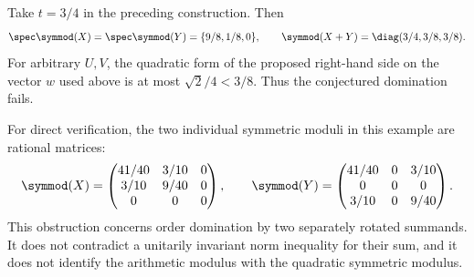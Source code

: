 \begin{corollary}\label{cor:mi06-rational}
Take $t=3/4$ in the preceding construction. Then
\[
 \spec\symmod(X)=\spec\symmod(Y)=\{9/8,1/8,0\},
 \qquad \symmod(X+Y)=\diag(3/4,3/8,3/8).
\]
For arbitrary $U,V$, the quadratic form of the proposed right-hand side on the vector $w$ used above is at most $\sqrt2/4<3/8$. Thus the conjectured domination fails.
\end{corollary}

For direct verification, the two individual symmetric moduli in this example are rational matrices:
\[
 \symmod(X)=\begin{pmatrix}41/40&3/10&0\\3/10&9/40&0\\0&0&0\end{pmatrix},\qquad
 \symmod(Y)=\begin{pmatrix}41/40&0&3/10\\0&0&0\\3/10&0&9/40\end{pmatrix}.
\]
This obstruction concerns order domination by two separately rotated summands. It does not contradict a unitarily invariant norm inequality for their sum, and it does not identify the arithmetic modulus with the quadratic symmetric modulus.
